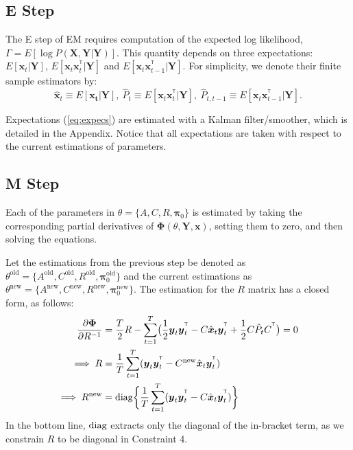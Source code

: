 \documentclass[fleqn,12pt]{article}
\let\oldref\ref
\renewcommand{\ref}[1]{(\oldref{#1})}
\newcommand{\T}{^{\ensuremath{\mathsf{T}}}}           %
\newcommand{\diag}{\operatornamewithlimits{diag}}
\providecommand{\mb}[1]{\boldsymbol{#1}}
\newcommand{\bx}{\mb{x}}
\newcommand{\by}{\mb{y}}
\newcommand{\bX}{\mb{X}}
\newcommand{\bY}{\mb{Y}}
\begin{document}
\subsection{E Step}
The E step of EM requires computation of the expected log likelihood, $\Gamma = E[\log P(\bX,\bY|\bY)]$. This quantity depends on three expectations: $E[\bx_t|\bY]$, $E[\bx_t\bx_t^{\T}|\bY]$ and $E[\bx_t\bx_{t-1}^{\T}|\bY]$. For simplicity, we denote their finite sample estimators by:
%
%
%
%
%
\begin{equation}\label{eq:expecs}
\hat{\bx}_t \equiv E[\mathbf{x_t}|\bY],\  \hat{P}_t  \equiv E[\bx_t\bx_t^{\T}|\bY],\  \hat{P}_{t,t-1}  \equiv E[\bx_t\bx_{t-1}^{\T}|\bY].
\end{equation}

Expectations \ref{eq:expecs} are estimated with a Kalman filter/smoother, which is detailed in the Appendix. Notice that all expectations are taken with respect to the current estimations of parameters.
\subsection{M Step}
Each of the parameters in $\theta =\{A,C,R,\mathbf{\pi}_0\}$ is estimated by taking the corresponding partial derivatives of $\mathbf{\Phi}(\theta,\bY,\bx)$, setting them to zero, and then solving the equations.

Let the estimations from the previous step be denoted as $\theta^{\text{old}} =\{A^{\text{old}},C^{\text{old}},R^{\text{old}},\mathbf{\pi}_0^{\text{old}}\}$ and the current estimations as $\theta^{\text{new}} =\{A^{\text{new}},C^{\text{new}},R^{\text{new}},\mathbf{\pi}_0^{\text{new}}\}$. The estimation for the $R$ matrix has a closed form, as follows:
\begin{equation}\label{eq:updateR}
\begin{aligned}
\frac{\partial \mathbf{\Phi}}{\partial R^{-1}} &= \frac{T}{2}R - \sum\limits_{t=1}^T\bigl(\frac{1}{2}\by_t\by_t^{\T} - C\hat{\bx}_t\by_t^{\T}+\frac{1}{2}C\hat{P}_tC^{\T}\bigr) =0 \\
\implies R &= \frac{1}{T}\sum\limits_{t=1}^{T}(\by_t\by_t^{\T}-C^{\text{new}}\hat{\bx}_t\by_t^{\T})\\
\implies R^{\text{new}} &= \diag \biggl\{\frac{1}{T}\sum\limits_{t=1}^{T}(\by_t\by_t^{\T}-C\hat{\bx}_t\by_t^{\T})\biggr\}
\end{aligned}
\end{equation}
In the bottom line, $\diag$ extracts only the diagonal of the in-bracket term, as we constrain $R$ to be diagonal in Constraint 4.
\end{document}
